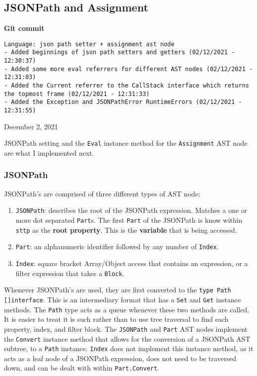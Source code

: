 \subsection{JSONPath and Assignment}

\begin{center}
    \textbf{Git commit}
    \begin{verbatim}
Language: json path setter + assignment ast node
- Added beginnings of json path setters and getters (02/12/2021 - 12:30:37)
- Added some more eval referrers for different AST nodes (02/12/2021 - 12:31:03)
- Added the Current referrer to the CallStack interface which returns the topmost frame (02/12/2021 - 12:31:33)
- Added the Exception and JSONPathError RuntimeErrors (02/12/2021 - 12:31:55)
    \end{verbatim}
    \vspace{-1em}
    \tiny{December 2, 2021}
\end{center}

JSONPath setting and the \verb|Eval| instance method for the \verb|Assignment| AST node are what I implemented next.

\subsubsection{JSONPath}

JSONPath's are comprised of three different types of AST node:

\begin{enumerate}
    \item \verb|JSONPath|: describes the root of the JSONPath expression. Matches a one or more dot separated \verb|Part|s. The first \verb|Part| of the JSONPath is know within \verb|sttp| as the \textbf{root property}. This is the \textbf{variable} that is being accessed.
    \item \verb|Part|: an alphanumeric identifier followed by any number of \verb|Index|.
    \item \verb|Index|: square bracket Array/Object access that contains an expression, or a filter expression that takes a \verb|Block|.
\end{enumerate}

Whenever JSONPath's are used, they are first converted to the \texttt{type Path []interface{}}. This is an intermediary format that has a \verb|Set| and \verb|Get| instance methods. The \verb|Path| type acts as a queue whenever these two methods are called. It is easier to treat it is such rather than to use tree traversal to find each property, index, and filter block. The \verb|JSONPath| and \verb|Part| AST nodes implement the \verb|Convert| instance method that allows for the conversion of a JSONPath AST subtree, to a \verb|Path| instance. \verb|Index| does not implement this instance method, as it acts as a leaf node of a JSONPath expression, does not need to be traversed down, and can be dealt with within \verb|Part.Convert|.

